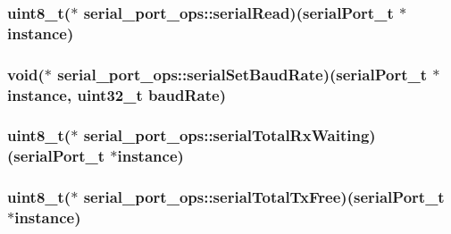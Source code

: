 \hypertarget{structserial__port__ops_aaf3d862270d8102947788db2cafb3dc8}{
\subsubsection[{serial\+Read}]{\setlength{\rightskip}{0pt plus 5cm}uint8\+\_\+t($\ast$ serial\+\_\+port\+\_\+ops\+::serial\+Read)({\bf serial\+Port\+\_\+t} $\ast$instance)}}\label{structserial__port__ops_aaf3d862270d8102947788db2cafb3dc8}
\hypertarget{structserial__port__ops_aff9a30e984333439de55b626e56ba8fe}{
\subsubsection[{serial\+Set\+Baud\+Rate}]{\setlength{\rightskip}{0pt plus 5cm}void($\ast$ serial\+\_\+port\+\_\+ops\+::serial\+Set\+Baud\+Rate)({\bf serial\+Port\+\_\+t} $\ast$instance, uint32\+\_\+t baud\+Rate)}}\label{structserial__port__ops_aff9a30e984333439de55b626e56ba8fe}
\hypertarget{structserial__port__ops_ab99d48d2e07a90806c11288003176eac}{
\subsubsection[{serial\+Total\+Rx\+Waiting}]{\setlength{\rightskip}{0pt plus 5cm}uint8\+\_\+t($\ast$ serial\+\_\+port\+\_\+ops\+::serial\+Total\+Rx\+Waiting)({\bf serial\+Port\+\_\+t} $\ast$instance)}}\label{structserial__port__ops_ab99d48d2e07a90806c11288003176eac}
\hypertarget{structserial__port__ops_adc846306b3e2efba89c5c70d3f574780}{
\subsubsection[{serial\+Total\+Tx\+Free}]{\setlength{\rightskip}{0pt plus 5cm}uint8\+\_\+t($\ast$ serial\+\_\+port\+\_\+ops\+::serial\+Total\+Tx\+Free)({\bf serial\+Port\+\_\+t} $\ast$instance)}}\label{structserial__port__ops_adc846306b3e2efba89c5c70d3f574780}
